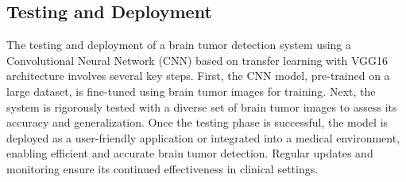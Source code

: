 \subsection{Testing and Deployment}
 The testing and deployment of a brain tumor detection system using a Convolutional Neural Network (CNN) based on transfer learning with VGG16 architecture involves several key steps. First, the CNN model, pre-trained on a large dataset, is fine-tuned using brain tumor images for training. Next, the system is rigorously tested with a diverse set of brain tumor images to assess its accuracy and generalization. Once the testing phase is successful, the model is deployed as a user-friendly application or integrated into a medical environment, enabling efficient and accurate brain tumor detection. Regular updates and monitoring ensure its continued effectiveness in clinical settings.





